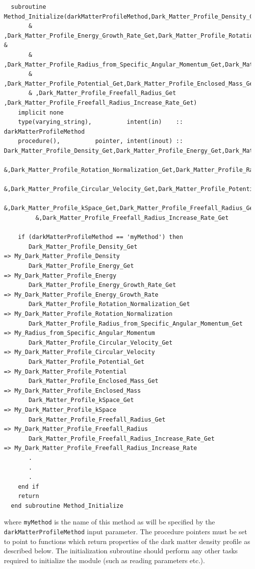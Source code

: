 \begin{verbatim}
  subroutine Method_Initialize(darkMatterProfileMethod,Dark_Matter_Profile_Density_Get,Dark_Matter_Profile_Energy_Get&
       & ,Dark_Matter_Profile_Energy_Growth_Rate_Get,Dark_Matter_Profile_Rotation_Normalization_Get &
       & ,Dark_Matter_Profile_Radius_from_Specific_Angular_Momentum_Get,Dark_Matter_Profile_Circular_Velocity_Get&
       & ,Dark_Matter_Profile_Potential_Get,Dark_Matter_Profile_Enclosed_Mass_Get,Dark_Matter_Profile_kSpace_Get&
       & ,Dark_Matter_Profile_Freefall_Radius_Get ,Dark_Matter_Profile_Freefall_Radius_Increase_Rate_Get)
    implicit none
    type(varying_string),          intent(in)    :: darkMatterProfileMethod
    procedure(),          pointer, intent(inout) :: Dark_Matter_Profile_Density_Get,Dark_Matter_Profile_Energy_Get,Dark_Matter_Profile_Energy_Growth_Rate_Get&
         &,Dark_Matter_Profile_Rotation_Normalization_Get,Dark_Matter_Profile_Radius_from_Specific_Angular_Momentum_Get&
         &,Dark_Matter_Profile_Circular_Velocity_Get,Dark_Matter_Profile_Potential_Get,Dark_Matter_Profile_Enclosed_Mass_Get&
         &,Dark_Matter_Profile_kSpace_Get,Dark_Matter_Profile_Freefall_Radius_Get&
         &,Dark_Matter_Profile_Freefall_Radius_Increase_Rate_Get

    if (darkMatterProfileMethod == 'myMethod') then
       Dark_Matter_Profile_Density_Get                               => My_Dark_Matter_Profile_Density
       Dark_Matter_Profile_Energy_Get                                => My_Dark_Matter_Profile_Energy
       Dark_Matter_Profile_Energy_Growth_Rate_Get                    => My_Dark_Matter_Profile_Energy_Growth_Rate
       Dark_Matter_Profile_Rotation_Normalization_Get                => My_Dark_Matter_Profile_Rotation_Normalization
       Dark_Matter_Profile_Radius_from_Specific_Angular_Momentum_Get => My_Radius_from_Specific_Angular_Momentum
       Dark_Matter_Profile_Circular_Velocity_Get                     => My_Dark_Matter_Profile_Circular_Velocity
       Dark_Matter_Profile_Potential_Get                             => My_Dark_Matter_Profile_Potential
       Dark_Matter_Profile_Enclosed_Mass_Get                         => My_Dark_Matter_Profile_Enclosed_Mass
       Dark_Matter_Profile_kSpace_Get                                => My_Dark_Matter_Profile_kSpace
       Dark_Matter_Profile_Freefall_Radius_Get                       => My_Dark_Matter_Profile_Freefall_Radius
       Dark_Matter_Profile_Freefall_Radius_Increase_Rate_Get         => My_Dark_Matter_Profile_Freefall_Radius_Increase_Rate
       .
       .
       .
    end if
    return
  end subroutine Method_Initialize
\end{verbatim}
where {\tt myMethod} is the name of this method as will be specified by the {\tt darkMatterProfileMethod} input parameter. The procedure pointers must be set to point to functions which return properties of the dark matter density profile as described below. The initialization subroutine should perform any other tasks required to initialize the module (such as reading parameters etc.).

